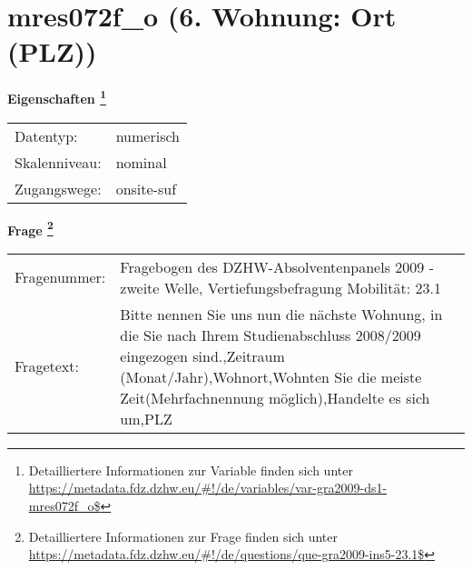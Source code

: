 
    \setcounter{footnote}{0}

    \vspace*{-1.8cm}
	\section{mres072f\_o (6. Wohnung: Ort (PLZ))}
	\label{section:mres072f_o}



    \vspace*{0.5cm}
    \noindent\textbf{Eigenschaften
	\footnote{Detailliertere Informationen zur Variable finden sich unter
		\url{https://metadata.fdz.dzhw.eu/\#!/de/variables/var-gra2009-ds1-mres072f_o$}}}\\
	\begin{tabularx}{\hsize}{@{}lX}
	Datentyp: & numerisch \\
	Skalenniveau: & nominal \\
	Zugangswege: &
	  onsite-suf
 \\
    \end{tabularx}



				\vspace*{0.5cm}
                \noindent\textbf{Frage
	                \footnote{Detailliertere Informationen zur Frage finden sich unter
		              \url{https://metadata.fdz.dzhw.eu/\#!/de/questions/que-gra2009-ins5-23.1$}}}\\
				\begin{tabularx}{\hsize}{@{}lX}
					Fragenummer: &
					  Fragebogen des DZHW-Absolventenpanels 2009 - zweite Welle, Vertiefungsbefragung Mobilität:
					  23.1
 \\
					Fragetext: & Bitte nennen Sie uns nun die nächste Wohnung, in die Sie nach Ihrem Studienabschluss 2008/2009 eingezogen sind.,Zeitraum (Monat/Jahr),Wohnort,Wohnten Sie die meiste Zeit(Mehrfachnennung möglich),Handelte es sich um,PLZ \\
				\end{tabularx}





